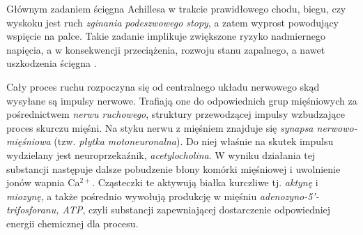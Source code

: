Głównym zadaniem ścięgna Achillesa w trakcie prawidłowego chodu, biegu, czy wyskoku jest ruch \textit{zginania podeszwowego stopy}, a zatem wyprost powodujący wspięcie na palce. Takie zadanie implikuje zwiększone ryzyko nadmiernego napięcia, a w konsekwencji przeciążenia, rozwoju stanu zapalnego, a nawet uszkodzenia ścięgna \cite{Etiologia}.

Cały proces ruchu rozpoczyna się od centralnego układu nerwowego skąd wysyłane są impulsy nerwowe. Trafiają one do odpowiednich grup mięśniowych za pośrednictwem \textit{nerwu ruchowego}, struktury  przewodzącej impulsy wzbudzające proces skurczu mięśni. Na styku nerwu z mięśniem znajduje się \textit{synapsa nerwowo-mięśniowa} (tzw. \textit{płytka motoneuronalna}). Do niej właśnie na skutek impulsu wydzielany jest neuroprzekaźnik, \textit{acetylocholina}. W wyniku działania tej substancji następuje dalsze pobudzenie błony komórki mięśniowej i uwolnienie jonów wapnia Ca$^{2+}$. Cząsteczki te aktywują białka kurczliwe tj. \textit{aktynę} i \textit{miozynę}, a także pośrednio wywołują produkcję w mięśniu \textit{adenozyno-5'-trifosforanu, ATP}, czyli substancji zapewniającej dostarczenie odpowiedniej energii chemicznej dla procesu.


